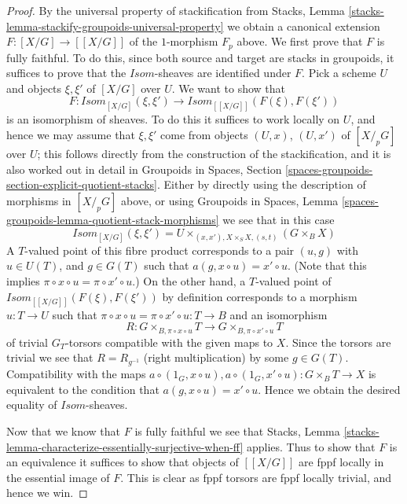 \documentclass[10pt,a4paper]{amsart}
\theoremstyle{plain}
\theoremstyle{definition}
\theoremstyle{remark}
\numberwithin{equation}{subsection}
\begin{document}
\begin{proof}
\medskip\noindent
By the universal property of stackification from
Stacks, Lemma \ref{stacks-lemma-stackify-groupoids-universal-property}
we obtain a canonical extension $F : [X/G] \to [[X/G]]$ of the $1$-morphism
$F_p$ above. We first prove that $F$ is fully faithful.
To do this, since both source and target are stacks in groupoids,
it suffices to prove that the $\mathit{Isom}$-sheaves are identified
under $F$. Pick a scheme $U$ and objects $\xi, \xi'$ of
$[X/G]$ over $U$. We want to show that
$$
F :
\mathit{Isom}_{[X/G]}(\xi, \xi')
\longrightarrow
\mathit{Isom}_{[[X/G]]}(F(\xi), F(\xi'))
$$
is an isomorphism of sheaves. To do this it suffices to work locally
on $U$, and hence we may assume that $\xi, \xi'$ come from objects
$(U, x)$, $(U, x')$ of $[X/_{\!p}G]$ over $U$; this follows directly
from the construction of the stackification, and it is also worked
out in detail in
Groupoids in Spaces,
Section \ref{spaces-groupoids-section-explicit-quotient-stacks}.
Either by directly using the description of morphisms in
$[X/_{\!p}G]$ above, or using
Groupoids in Spaces,
Lemma \ref{spaces-groupoids-lemma-quotient-stack-morphisms}
we see that in this case
$$
\mathit{Isom}_{[X/G]}(\xi, \xi') =
U \times_{(x, x'), X \times_S X, (s, t)} (G \times_B X)
$$
A $T$-valued point of this fibre product corresponds to a pair
$(u, g)$ with $u \in U(T)$, and $g \in G(T)$ such that
$a(g, x \circ u) = x' \circ u$. (Note that this implies
$\pi \circ x \circ u = \pi \circ x' \circ u$.)
On the other hand, a $T$-valued
point of $\mathit{Isom}_{[[X/G]]}(F(\xi), F(\xi'))$ by definition
corresponds to a morphism $u : T \to U$ such that
$\pi \circ x \circ u = \pi \circ x' \circ u : T \to B$ and an isomorphism
$$
R :
G \times_{B, \pi \circ x \circ u} T
\longrightarrow
G \times_{B, \pi \circ x' \circ u} T
$$
of trivial $G_T$-torsors compatible with the given maps to $X$.
Since the torsors are trivial we see that $R = R_{g^{-1}}$
(right multiplication) by some $g \in G(T)$. Compatibility with the maps
$a \circ (1_G, x \circ u), a \circ (1_G, x' \circ u) : G \times_B T \to X$
is equivalent to the condition that $a(g, x \circ u) = x' \circ u$.
Hence we obtain the desired equality of $\mathit{Isom}$-sheaves.

\medskip\noindent
Now that we know that $F$ is fully faithful we see that
Stacks, Lemma \ref{stacks-lemma-characterize-essentially-surjective-when-ff}
applies. Thus to show that $F$ is an equivalence it suffices
to show that objects of $[[X/G]]$ are fppf locally in the essential image
of $F$. This is clear as fppf torsors are fppf locally trivial, and hence
we win.
\end{proof}
\end{document}
